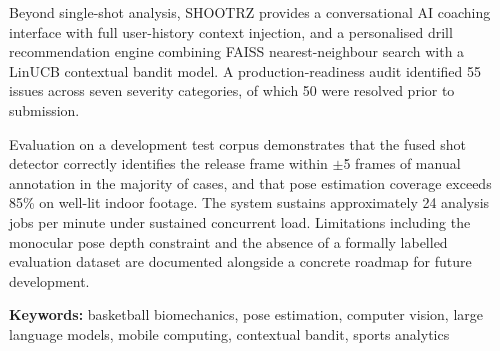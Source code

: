 Beyond single-shot analysis, SHOOTRZ provides a conversational AI coaching interface with full user-history context injection, and a personalised drill recommendation engine combining FAISS nearest-neighbour search with a LinUCB contextual bandit model. A production-readiness audit identified 55 issues across seven severity categories, of which 50 were resolved prior to submission.

Evaluation on a development test corpus demonstrates that the fused shot detector correctly identifies the release frame within $\pm$5 frames of manual annotation in the majority of cases, and that pose estimation coverage exceeds 85\% on well-lit indoor footage. The system sustains approximately 24 analysis jobs per minute under sustained concurrent load. Limitations including the monocular pose depth constraint and the absence of a formally labelled evaluation dataset are documented alongside a concrete roadmap for future development.

\vspace{1em}
\noindent\textbf{Keywords:} basketball biomechanics, pose estimation, computer vision, large language models, mobile computing, contextual bandit, sports analytics

\clearpage
